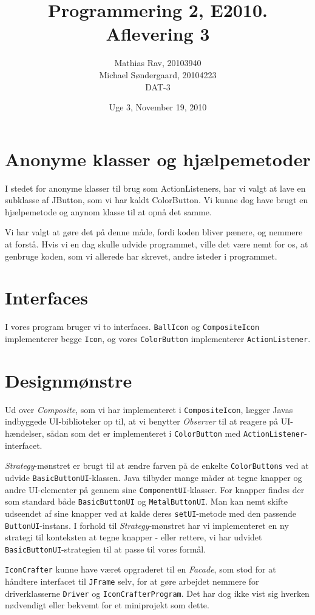 \documentclass[12pt,a4paper]{article}
\begin{document}
\title{Programmering 2, E2010. Aflevering 3}
\author{Mathias Rav, 20103940 \\
		Michael Søndergaard, 20104223 \\
		DAT-3}
\date{Uge 3, November 19, 2010}
\maketitle

\section{Anonyme klasser og hjælpemetoder}
I stedet for anonyme klasser til brug som ActionListeners, har vi valgt at 
lave en subklasse af JButton, som vi har kaldt ColorButton. Vi kunne dog 
have brugt en hjælpemetode og anynom klasse til at opnå det samme.

Vi har valgt at gøre det på denne måde, fordi koden bliver pænere, og nemmere
at forstå. Hvis vi en dag skulle udvide programmet, ville det være nemt for os,
at genbruge koden, som vi allerede har skrevet, andre isteder i programmet. 

\section{Interfaces}
I vores program bruger vi to interfaces. \texttt{BallIcon} og
\texttt{CompositeIcon} implementerer begge \texttt{Icon}, og vores
\texttt{ColorButton} implementerer \texttt{ActionListener}.

\section{Designmønstre}
Ud over \textit{Composite}, som vi har implementeret i \texttt{CompositeIcon},
lægger Javas indbyggede UI-biblioteker op til, at vi benytter \textit{Observer}
til at reagere på UI-hændelser, sådan som det er implementeret i
\texttt{ColorButton} med \texttt{ActionListener}-interfacet.

\textit{Strategy}-mønstret er brugt til at ændre farven på de enkelte
\texttt{ColorButtons} ved at udvide \texttt{BasicButtonUI}-klassen. Java
tilbyder mange måder at tegne knapper og andre UI-elementer på gennem sine
\texttt{ComponentUI}-klasser. For knapper findes der som standard både
\texttt{BasicButtonUI} og \texttt{MetalButtonUI}. Man kan nemt skifte udseendet
af sine knapper ved at kalde deres \texttt{setUI}-metode med den passende
\texttt{ButtonUI}-instans. I forhold til \textit{Strategy}-mønstret har vi
implementeret en ny strategi til konteksten at tegne knapper - eller rettere,
vi har udvidet \texttt{BasicButtonUI}-strategien til at passe til vores formål.

\texttt{IconCrafter} kunne have været opgraderet til en \textit{Facade}, som
stod for at håndtere interfacet til \texttt{JFrame} selv, for at gøre arbejdet
nemmere for driverklasserne \texttt{Driver} og \texttt{IconCrafterProgram}. Det
har dog ikke vist sig hverken nødvendigt eller bekvemt for et miniprojekt som
dette.
\end{document}
